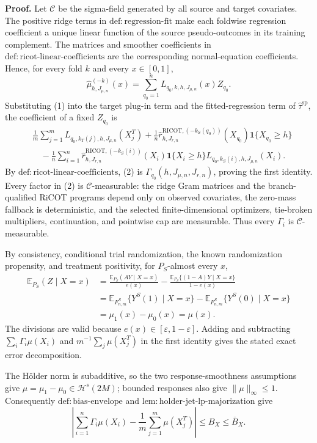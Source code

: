 \textbf{Proof.}
Let \(\mathcal C\) be the sigma-field generated by all source and target covariates. The positive ridge terms in \(\mathrm{def:regression\text{-}fit}\) make each foldwise regression coefficient a unique linear function of the source pseudo-outcomes in its training complement. The matrices and smoother coefficients in \(\mathrm{def:ricot\text{-}linear\text{-}coefficients}\) are the corresponding normal-equation coefficients. Hence, for every fold \(k\) and every \(x\in[0,1]\),
\[
\widehat\mu^{(-k)}_{h,J_{\mu,n}}(x)
=\sum_{q_0=1}^nL_{q_0,k,h,J_{\mu,n}}(x)Z_{q_0}.
\tag{1}
\]
Substituting (1) into the target plug-in term and the fitted-regression term of \(\widehat\tau^{\mathrm{sp}}\), the coefficient of a fixed \(Z_{q_0}\) is
\[
\begin{aligned}
{}&\frac1m\sum_{j=1}^mL_{q_0,k_T(j),h,J_{\mu,n}}(X_j^T)
+\frac1n\widehat r^{\mathrm{RICOT},(-k_S(q_0))}_{h,J_{r,n}}(X_{q_0})\mathbf 1\{X_{q_0}\ge h\}\\
&\quad-\frac1n\sum_{i=1}^n
\widehat r^{\mathrm{RICOT},(-k_S(i))}_{h,J_{r,n}}(X_i)\mathbf 1\{X_i\ge h\}
L_{q_0,k_S(i),h,J_{\mu,n}}(X_i).
\end{aligned}
\tag{2}
\]
By \(\mathrm{def:ricot\text{-}linear\text{-}coefficients}\), (2) is \(\Gamma_{q_0}(h,J_{\mu,n},J_{r,n})\), proving the first identity. Every factor in (2) is \(\mathcal C\)-measurable: the ridge Gram matrices and the branch-qualified RiCOT programs depend only on observed covariates, the zero-mass fallback is deterministic, and the selected finite-dimensional optimizers, tie-broken multipliers, continuation, and pointwise cap are measurable. Thus every \(\Gamma_i\) is \(\mathcal C\)-measurable.

By consistency, conditional trial randomization, the known randomization propensity, and treatment positivity, for \(P_S\)-almost every \(x\),
\[
\begin{aligned}
\mathbb E_{P_S}(Z\mid X=x)
&=\frac{\mathbb E_{P_S}(AY\mid X=x)}{e(x)}
-\frac{\mathbb E_{P_S}\{(1-A)Y\mid X=x\}}{1-e(x)}\\
&=\mathbb E_{F^S_{n,m}}\{Y^S(1)\mid X=x\}
-\mathbb E_{F^S_{n,m}}\{Y^S(0)\mid X=x\}\\
&=\mu_1(x)-\mu_0(x)=\mu(x).
\end{aligned}
\tag{3}
\]
The divisions are valid because \(e(x)\in[\varepsilon,1-\varepsilon]\). Adding and subtracting \(\sum_i\Gamma_i\mu(X_i)\) and \(m^{-1}\sum_j\mu(X_j^T)\) in the first identity gives the stated exact error decomposition.

The H\"older norm is subadditive, so the two response-smoothness assumptions give \(\mu=\mu_1-\mu_0\in\mathcal H^s(2M)\); bounded responses also give \(\|\mu\|_\infty\le1\). Consequently \(\mathrm{def:bias\text{-}envelope}\) and \(\mathrm{lem:holder\text{-}jet\text{-}lp\text{-}majorization}\) give
\[
\left|\sum_{i=1}^n\Gamma_i\mu(X_i)-\frac1m\sum_{j=1}^m\mu(X_j^T)\right|
\le B_X\le\overline B_X.
\tag{4}
\]

